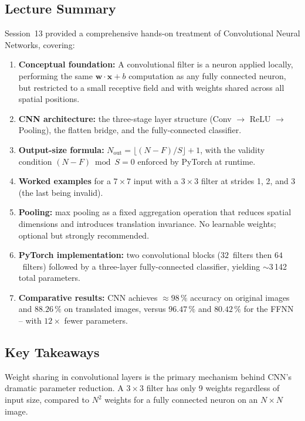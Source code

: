 \documentclass[12pt,a4paper]{article}
\begin{document}
\subsection{Lecture Summary}
\label{subsec:lecture_summary}

Session~13 provided a comprehensive hands-on treatment of Convolutional
Neural Networks, covering:

\begin{enumerate}[label=\arabic*., leftmargin=2.5em]
  \item \textbf{Conceptual foundation:} A convolutional filter is a neuron
        applied locally, performing the same $\mathbf{w}\cdot\mathbf{x}+b$
        computation as any fully connected neuron, but restricted to a small
        receptive field and with weights shared across all spatial positions.
  \item \textbf{CNN architecture:} the three-stage layer structure
        (Conv $\to$ ReLU $\to$ Pooling), the flatten bridge, and the
        fully-connected classifier.
  \item \textbf{Output-size formula:}
        $N_{\text{out}} = \lfloor(N-F)/S\rfloor + 1$, with the validity
        condition $(N-F) \bmod S = 0$ enforced by PyTorch at runtime.
  \item \textbf{Worked examples} for a $7\times7$ input with a $3\times3$
        filter at strides 1, 2, and 3 (the last being invalid).
  \item \textbf{Pooling:} max pooling as a fixed aggregation operation that
        reduces spatial dimensions and introduces translation invariance.
        No learnable weights; optional but strongly recommended.
  \item \textbf{PyTorch implementation:} two convolutional blocks
        ($32$~filters then $64$~filters) followed by a three-layer
        fully-connected classifier, yielding $\sim$3\,142 total parameters.
  \item \textbf{Comparative results:} CNN achieves $\approx98\,\%$ accuracy
        on original images and $88.26\,\%$ on translated images, versus
        $96.47\,\%$ and $80.42\,\%$ for the FFNN -- with $12\times$ fewer
        parameters.
\end{enumerate}

\subsection{Key Takeaways}
\label{subsec:takeaways}

\begin{keyinsight}[title=Key Takeaway 1 -- Parameter Efficiency]
Weight sharing in convolutional layers is the primary mechanism behind CNN's
dramatic parameter reduction.  A $3\times3$ filter has only 9 weights
regardless of input size, compared to $N^2$ weights for a fully connected
neuron on an $N\times N$ image.
\end{keyinsight}
\end{document}
